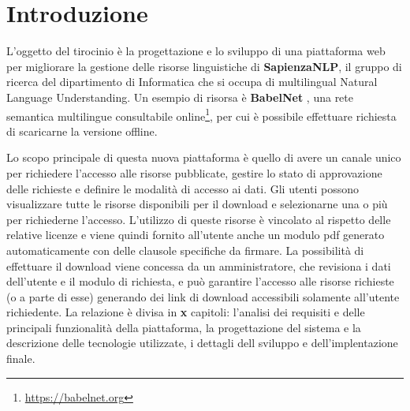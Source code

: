 
\chapter{Introduzione}

L'oggetto del tirocinio è la progettazione e lo sviluppo di una piattaforma web
per migliorare la gestione delle risorse linguistiche di \textbf{SapienzaNLP},
il gruppo di ricerca del dipartimento di Informatica che si occupa di multilingual
Natural Language Understanding.
Un esempio di risorsa è \textbf{BabelNet} \cite{NavigliPonzetto:12aij}, una rete
semantica multilingue consultabile online\footnote{\url{https://babelnet.org}},
per cui è possibile effettuare richiesta di scaricarne la versione offline.

Lo scopo principale di questa nuova piattaforma è quello di avere un canale unico
per richiedere l'accesso alle risorse pubblicate, gestire lo stato di approvazione
delle richieste e definire le modalità di accesso ai dati.
Gli utenti possono visualizzare tutte le risorse disponibili per il download
e selezionarne una o più per richiederne l'accesso. L'utilizzo di queste risorse
è vincolato al rispetto delle relative licenze e viene quindi fornito all'utente
anche un modulo pdf generato automaticamente con delle clausole specifiche da firmare.
La possibilità di effettuare il download viene concessa da un amministratore, che
revisiona i dati dell'utente e il modulo di richiesta, e può garantire l'accesso
alle risorse richieste (o a parte di esse) generando dei link di download accessibili
solamente all'utente richiedente.
\newline
\newline
La relazione è divisa in {\textbf{\color{red}x}} capitoli:
l'analisi dei requisiti e delle principali funzionalità della piattaforma,
la progettazione del sistema e la descrizione delle tecnologie utilizzate,
i dettagli dell sviluppo e dell'implentazione finale.
